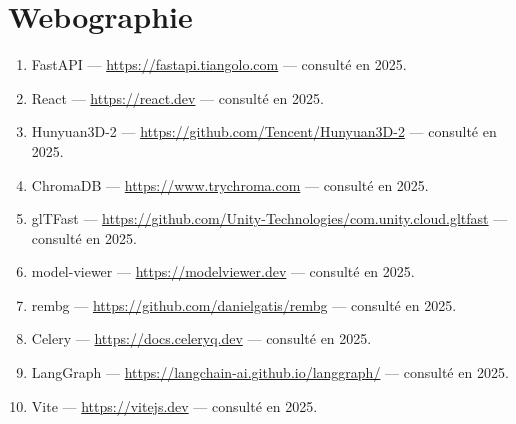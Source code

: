 \documentclass[12pt,a4paper,oneside]{report}
\begin{document}
\cleardoublepage
\printbibliography[heading=bibintoc,title={Bibliographie}]

\cleardoublepage
\chapter*{Webographie}
\begin{enumerate}
  \item FastAPI --- \url{https://fastapi.tiangolo.com} --- consulté en 2025.
  \item React --- \url{https://react.dev} --- consulté en 2025.
  \item Hunyuan3D-2 --- \url{https://github.com/Tencent/Hunyuan3D-2} --- consulté en 2025.
  \item ChromaDB --- \url{https://www.trychroma.com} --- consulté en 2025.
  \item glTFast --- \url{https://github.com/Unity-Technologies/com.unity.cloud.gltfast} --- consulté en 2025.
  \item model-viewer --- \url{https://modelviewer.dev} --- consulté en 2025.
  \item rembg --- \url{https://github.com/danielgatis/rembg} --- consulté en 2025.
  \item Celery --- \url{https://docs.celeryq.dev} --- consulté en 2025.
  \item LangGraph --- \url{https://langchain-ai.github.io/langgraph/} --- consulté en 2025.
  \item Vite --- \url{https://vitejs.dev} --- consulté en 2025.
\end{enumerate}

\appendix
\end{document}
